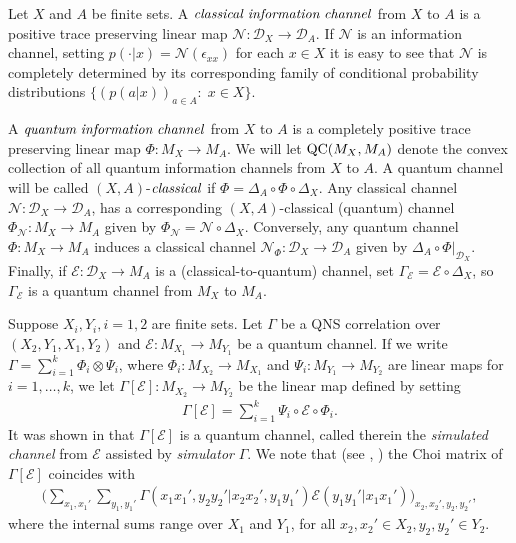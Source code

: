 \documentclass[11pt]{amsart}
\newcommand{\cl}[1]{\mathcal{#1}}
\begin{document}
Let $X$ and $A$ be finite sets. A ${\it classical \; information \; channel}$ from $X$ to $A$ is a positive trace preserving linear map $\cl{N}: \cl{D}_{X}\rightarrow \cl{D}_{A}$. If $\cl{N}$ is an information channel, setting $p(\cdot|x) = \cl{N}(\epsilon_{xx})$ for each $x \in X$ it is easy to see that $\cl{N}$ is completely determined by its corresponding family of conditional probability distributions $\{(p(a|x))_{a \in A}: \; x \in X\}$. 


A ${\it quantum \; information \; channel}$ from $X$ to $A$ is a completely positive trace preserving linear map $\Phi: M_{X}\rightarrow M_{A}$. We will let ${\rm QC}(M_{X}, M_{A})$ denote the convex collection of all quantum information channels from $X$ to $A$. A quantum channel will be called $(X, A)$-${\it classical}$ if $\Phi = \Delta_{A}\circ \Phi \circ \Delta_{X}$. Any classical channel $\cl{N}: \cl{D}_{X}\rightarrow \cl{D}_{A}$, has a corresponding $(X, A)$-classical (quantum) channel $\Phi_{\cl{N}}: M_{X}\rightarrow M_{A}$ given by $\Phi_{\cl{N}} = \cl{N}\circ \Delta_{X}$. Conversely, any quantum channel $\Phi: M_{X}\rightarrow M_{A}$ induces a classical channel $\cl{N}_{\Phi}: \cl{D}_{X}\rightarrow \cl{D}_{A}$ given by $\Delta_{A} \circ \Phi|_{\cl{D}_{X}}$. Finally, if $\cl{E}: \cl{D}_{X}\rightarrow M_{A}$ is a (classical-to-quantum) channel, set $\Gamma_{\cl{E}} = \cl{E}\circ \Delta_{X}$, so $\Gamma_{\cl{E}}$ is a quantum channel from $M_{X}$ to $M_{A}$. 

Suppose $X_{i}, Y_{i}, i = 1, 2$ are finite sets. Let $\Gamma$ be a QNS correlation over $(X_{2}, Y_{1}, X_{1}, Y_{2})$ and $\cl{E}: M_{X_{1}}\rightarrow M_{Y_{1}}$ be a quantum channel. If we write $\Gamma = \sum_{i=1}^{k}\Phi_{i}\otimes \Psi_{i}$, where $\Phi_{i}: M_{X_{2}}\rightarrow M_{X_{1}}$ and $\Psi_{i}: M_{Y_{1}}\rightarrow M_{Y_{2}}$ are linear maps for $i = 1, \hdots, k$, we let $\Gamma[\cl{E}]: M_{X_{2}}\rightarrow M_{Y_{2}}$ be the linear map defined by setting
\begin{gather}\label{qns_simulation}
	\Gamma[\cl{E}] = \sum\limits_{i=1}^{k}\Psi_{i}\circ \cl{E}\circ \Phi_{i}.
\end{gather}
\noindent It was shown in \cite{dw} that $\Gamma[\cl{E}]$ is a quantum channel, called therein the \textit{simulated channel} from $\cl{E}$ assisted by \textit{simulator} $\Gamma$. We note that (see \cite{gt_one}, \cite{gt_two}) the Choi matrix of $\Gamma[\cl{E}]$ coincides with
\begin{gather}\label{choi_simulated_eqn}
	\bigg(\sum\limits_{x_{1}, x_{1}'}\sum\limits_{y_{1}, y_{1}'}\Gamma(x_{1}x_{1}', y_{2}y_{2}'|x_{2}x_{2}', y_{1}y_{1}')\cl{E}(y_{1}y_{1}'|x_{1}x_{1}')\bigg)_{x_{2}, x_{2}', y_{2}, y_{2}'},
\end{gather}
\noindent where the internal sums range over $X_{1}$ and $Y_{1}$, for all $x_{2}, x_{2}' \in X_{2}, y_{2}, y_{2}' \in Y_{2}$.
\end{document}
